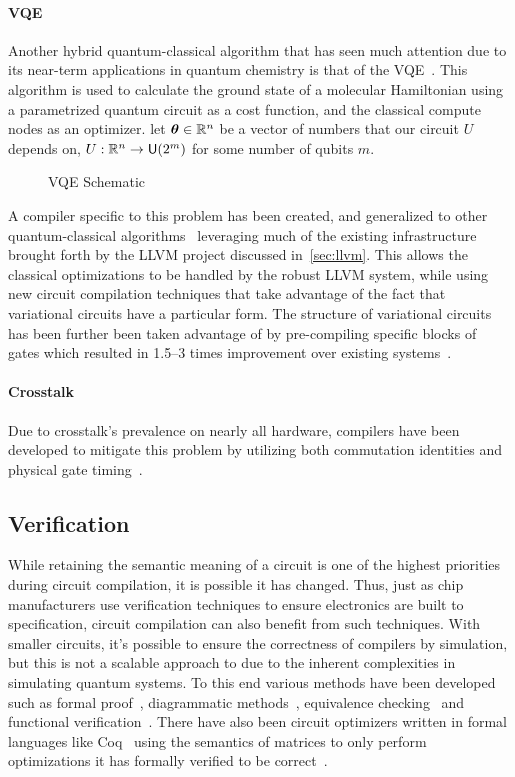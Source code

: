 \paragraph{VQE}
Another hybrid quantum-classical algorithm that has seen much attention due to its near-term applications in quantum chemistry is that of the \ac{VQE}~\cite{vqe,vqe2}.
This algorithm is used to calculate the ground state of a molecular Hamiltonian using a parametrized quantum circuit as a cost function, and the classical compute nodes as an optimizer.
\Eg{} let $\boldsymbol{\theta} \in \mathbb{R}^n$ be a vector of numbers that our circuit $U$ depends on, \ie{} $U: \mathbb{R}^n \to \mathsf{U} (2^m)$ for some number of qubits $m$.
\begin{figure}[ht]
    \centering
    
    \caption{\acs{VQE} Schematic}
\end{figure}
A compiler specific to this problem has been created, and generalized to other quantum-classical algorithms~\cite{vqe-compiler} leveraging much of the existing infrastructure brought forth by the LLVM project discussed in~\cref{sec:llvm}.
This allows the classical optimizations to be handled by the robust LLVM system, while using new circuit compilation techniques that take advantage of the fact that variational circuits have a particular form.
The structure of variational circuits has been further been taken advantage of by pre-compiling specific blocks of gates which resulted in 1.5--3 times improvement over existing systems~\cite{vqe-partial}.

\paragraph{Crosstalk}
Due to crosstalk's prevalence on nearly all hardware, compilers have been developed to mitigate this problem by utilizing both commutation identities and physical gate timing~\cite{crosstalk-commute,crosstalk-mitigation}. %

\subsection{Verification}

While retaining the semantic meaning of a circuit is one of the highest priorities during circuit compilation, it is possible it has changed.
Thus, just as chip manufacturers use verification techniques to ensure electronics are built to specification, circuit compilation can also benefit from such techniques.
With smaller circuits, it's possible to ensure the correctness of compilers by simulation, but this is not a scalable approach to due to the inherent complexities in simulating quantum systems.
To this end various methods have been developed such as formal proof~\cite{circuit-verification-formal-proof}, diagrammatic methods~\cite{circuit-verification-diagrammatic}, equivalence checking~\cite{circuit-verification-equivalence-check} and functional verification~\cite{circuit-verification-functional}.
There have also been circuit optimizers written in formal languages like Coq~\cite{coq} using the semantics of matrices to only perform optimizations it has formally verified to be correct~\cite{verified-optimizer}.


